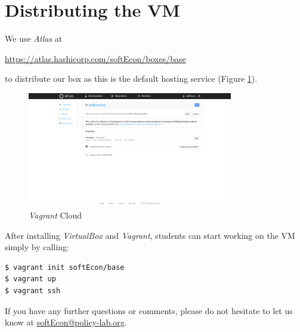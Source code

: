 \section{Distributing the VM}
We use \textit{Atlas} at
%
\begin{center}
\url{https://atlas.hashicorp.com/softEcon/boxes/base}
\end{center}
% 
to distribute our box as this is the default hosting service (Figure \ref{Hashicorp}).
%
\begin{figure}[h!]\centering\caption{\textit{Vagrant} Cloud}\vspace{0.3cm}\label{Hashicorp}
\includegraphics[width=0.8\textwidth]{material/hashicorp.png}
\end{figure}
%
After installing \textit{VirtualBox} and \textit{Vagrant}, students can start working on the VM simply by calling:
%
\vspace{0.2cm}\begin{lstlisting} 
$ vagrant init softEcon/base
$ vagrant up
$ vagrant ssh
\end{lstlisting}\vspace{0.2cm}
%
\noindent If you have any further questions or comments, please do not hesitate to let us know at \href{mailto:softEcon@policy-lab.org}{softEcon@policy-lab.org}.

\nocite{Hashimoto.2013}




